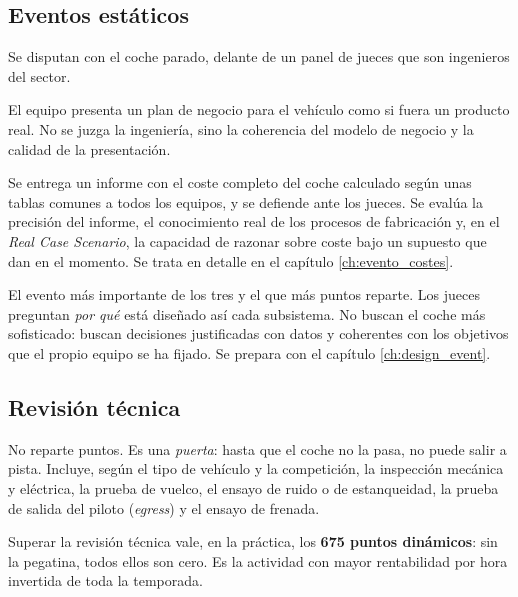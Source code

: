 \subsection{Eventos estáticos}

Se disputan con el coche parado, delante de un panel de jueces que son
ingenieros del sector.

\begin{description}[leftmargin=0pt,labelsep=0pt,style=nextline]
  \item[\textit{Business Plan Presentation}] El equipo presenta un plan de
    negocio para el vehículo como si fuera un producto real. No se juzga la
    ingeniería, sino la coherencia del modelo de negocio y la calidad de la
    presentación.
  \item[\textit{Cost and Manufacturing}] Se entrega un informe con el coste
    completo del coche calculado según unas tablas comunes a todos los equipos, y
    se defiende ante los jueces. Se evalúa la precisión del informe, el
    conocimiento real de los procesos de fabricación y, en el \textit{Real Case
    Scenario}, la capacidad de razonar sobre coste bajo un supuesto que dan en el
    momento. Se trata en detalle en el capítulo \ref{ch:evento_costes}.
  \item[\textit{Engineering Design}] El evento más importante de los tres y el
    que más puntos reparte. Los jueces preguntan \emph{por qué} está diseñado así
    cada subsistema. No buscan el coche más sofisticado: buscan decisiones
    justificadas con datos y coherentes con los objetivos que el propio equipo se
    ha fijado. Se prepara con el capítulo \ref{ch:design_event}.
\end{description}

\subsection{Revisión técnica}

No reparte puntos. Es una \emph{puerta}: hasta que el coche no la pasa, no puede
salir a pista. Incluye, según el tipo de vehículo y la competición, la inspección
mecánica y eléctrica, la prueba de vuelco, el ensayo de ruido o de estanqueidad,
la prueba de salida del piloto (\emph{egress}) y el ensayo de frenada.

\begin{clave}
Superar la revisión técnica vale, en la práctica, los \textbf{675 puntos
dinámicos}: sin la pegatina, todos ellos son cero. Es la actividad con mayor
rentabilidad por hora invertida de toda la temporada.
\end{clave}

